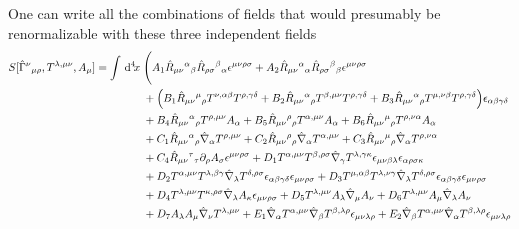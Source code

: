 \documentclass[twocolumn,
  showpacs,showkeys,prd,superscriptaddress]{revtex4-1}
\begin{document}
One can  write all the combinations of fields that would presumably be renormalizable with these three independent fields
\begin{equation}
  \begin{split}
    \label{3+1full}
     S[\hat{\Gamma}^{\nu}{}_{\mu\rho},T^{\lambda,\mu\nu},A_{\mu}] =\int \dn{4}{x} & \Bigg( A_1 \hat{ R}_{\mu\nu}{}^{\alpha}{}_\beta \hat{ R}_{\rho\sigma}{}^{\beta}{}_\alpha\epsilon^{\mu\nu\rho\sigma}+A_2 \hat{ R}_{\mu\nu}{}^{\alpha}{}_\alpha \hat{ R}_{\rho\sigma}{}^{\beta}{}_\beta\epsilon^{\mu\nu\rho\sigma}
    \\
    & + \Big(B_1 \hat{ R}_{\mu\nu}{}^{\mu}{}_\rho T^{\nu,\alpha\beta}T^{\rho,\gamma\delta}+B_2 \hat{ R}_{\mu\nu}{}^{\alpha}{}_\rho T^{\beta,\mu\nu}T^{\rho,\gamma\delta}+B_3\hat{ R}_{\mu\nu}{}^{\alpha}{}_\rho T^{\mu,\nu\beta}T^{\rho,\gamma\delta}\Big)\epsilon_{\alpha\beta\gamma\delta}
    \\
    & + B_4\hat{ R}_{\mu\nu}{}^{\alpha}{}_\rho T^{\rho,\mu\nu}A_\alpha+B_5\hat{ R}_{\mu\nu}{}^{\rho}{}_\rho T^{\alpha,\mu\nu}A_\alpha+B_6 \hat{ R}_{\mu\nu}{}^{\mu}{}_\rho T^{\rho,\nu\alpha}A_\alpha 
    \\
    & + C_1\hat{ R}_{\mu\nu}{}^{\alpha}{}_\rho \hat{\nabla}_\alpha T^{\rho,\mu\nu}+C_2\hat{ R}_{\mu\nu}{}^{\rho}{}_\rho \hat{\nabla}_\alpha T^{\alpha,\mu\nu} +C_3 \hat{ R}_{\mu\nu}{}^{\mu}{}_\rho \hat{\nabla}_\alpha T^{\rho,\nu\alpha}
    \\
    & +C_4\hat{ R}_{\mu\nu}{}^{\tau}{}_\tau \partial_\rho A_\sigma \epsilon^{\mu\nu\rho\sigma}+D_1T^{\alpha,\mu\nu}T^{\beta,\rho\sigma}\hat{\nabla}_\gamma T^{\lambda,\gamma\kappa}\epsilon_{\mu\nu\beta\lambda}\epsilon_{\alpha\rho\sigma\kappa}
    \\  
    & + D_2T^{\alpha,\mu\nu}T^{\lambda,\beta\gamma}\hat{\nabla}_\lambda T^{\delta,\rho\sigma}\epsilon_{\alpha\beta\gamma\delta}\epsilon_{\mu\nu\rho\sigma}+D_3T^{\mu,\alpha\beta}T^{\lambda,\nu\gamma}\hat{\nabla}_\lambda T^{\delta,\rho\sigma}\epsilon_{\alpha\beta\gamma\delta}\epsilon_{\mu\nu\rho\sigma}
    \\
    & + D_4T^{\lambda,\mu\nu}T^{\kappa,\rho\sigma}\hat{\nabla}_\lambda A_\kappa \epsilon_{\mu\nu\rho\sigma}+D_5T^{\lambda,\mu\nu}A_\lambda\hat{\nabla}_\mu A_\nu +D_6T^{\lambda,\mu\nu}A_\mu\hat{\nabla}_\lambda A_\nu
    \\
    & + D_7A_\lambda  A_\mu\hat{\nabla}_\nu T^{\lambda,\mu\nu} +E_1\hat{\nabla}_\alpha T^{\alpha,\mu\nu}\hat{\nabla}_\beta T^{\beta,\lambda\rho}\epsilon_{\mu\nu\lambda\rho}+E_2\hat{\nabla}_\beta T^{\alpha,\mu\nu}\hat{\nabla}_\alpha T^{\beta,\lambda\rho}\epsilon_{\mu\nu\lambda\rho}

\end{split}
\end{equation}
\end{document}
